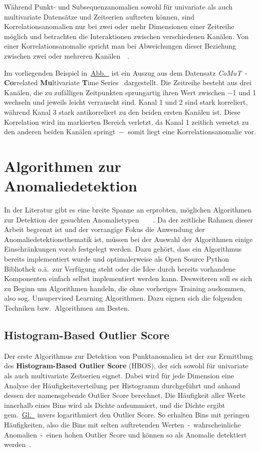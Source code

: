 Während Punkt- und Subsequenzanomalien sowohl für univariate als auch multivariate Datensätze und Zeitserien auftreten können, sind
Korrelationsanomalien nur bei zwei oder mehr Dimensionen einer Zeitreihe möglich und betrachten die Interaktionen zwischen
verschiedenen Kanälen. Von einer Korrelationsanomalie spricht man bei Abweichungen dieser Beziehung zwischen zwei oder mehreren
Kanälen~\cite[S.12-13]{Wenig2024}~\cite{Wenig2024a}.

Im vorliegenden Beispiel in~\hyperref[fig:correlation_Anomaly]{Abb.~} ist ein Auszug aus dem Datensatz
\textit{CoMuT}~- \textbf{Co}rrelated \textbf{Mu}lti\-variate \textbf{T}ime Series~\cite{NaumannCoMuT} dargestellt. Die Zeitreihe besteht
aus drei Kanälen, die zu zufälligen Zeitpunkten sprungartig ihren Wert zwischen $-$1 und 1 wechseln und jeweils leicht verrauscht sind.
Kanal 1 und 2 sind stark korreliert, während Kanal 3 stark antikorreliert zu den beiden ersten Kanälen ist. Diese Korrelation wird im
markierten Bereich verletzt, da Kanal 1 zeitlich versetzt zu den anderen beiden Kanälen springt~$-$~somit liegt eine
Korrelations\-anomalie vor.

\section{Algorithmen zur Anomaliedetektion}\label{sec:algorithmen}
In der Literatur gibt es eine breite Spanne an erprobten, möglichen Algorithmen zur Detektion der gesuchten
Anomalietypen~\cite{Schmidl2022}~\cite{BlazquezGarcia2020}~\cite{Mane2022}~\cite{Wenig2024a}. Da der zeitliche Rahmen dieser Arbeit
begrenzt ist und der vorrangige Fokus die Anwendung der Anomaliedetektionsthematik ist, müssen bei der Auswahl der Algorithmen
einige Einschränkungen vorab festgelegt werden. Dazu gehört, dass ein Algorithmus bereits implementiert wurde und optimalerweise als Open
Source Python Bibliothek o.ä.~zur Verfügung steht oder die Idee durch bereits vorhandene Komponenten einfach selbst implementiert
werden kann. Desweiteren soll es sich zu Beginn um Algorithmen handeln, die ohne vorheriges Training
auskommen, also sog. Unsupervised Learning Algorithmen. Dazu eignen sich die folgenden Techniken bzw.~Algorithmen am Besten.

\subsection{Histogram-Based Outlier Score}
Der erste Algorithmus zur Detektion von Punktanomalien ist der zur Ermittlung des \textbf{Histogram-Based Outlier Score} (HBOS), der sich
sowohl für univariate als auch multivariate Zeitserien eignet. Dabei wird für jede Dimension eine Analyse der Häufigkeitsverteilung per
Histogramm durchgeführt und anhand dessen der namensgebende Outlier Score berechnet. Die Häufigkeit aller Werte innerhalb eines Bins wird als
Dichte aufsummiert, und die Dichte ergibt gem.~\hyperref[eq:hbos]{Gl.~} invers logarithmiert den Outlier Score. So erhalten Bins
mit geringen Häufigkeiten, also die Bins mit selten auftretenden Werten~-~wahrscheinliche Anomalien~-~einen hohen Outlier Score und können
so als Anomalie detektiert werden~\cite{Goldstein2012}.

